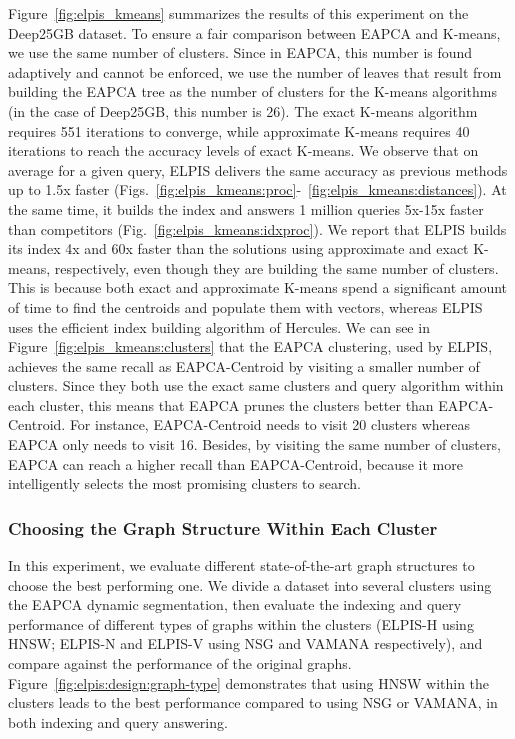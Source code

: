 Figure~\ref{fig:elpis_kmeans} summarizes the results of this experiment on the Deep25GB dataset. 
To ensure a fair comparison between EAPCA and K-means, we use the same number of clusters. Since in EAPCA, this number is found adaptively and cannot be enforced, we use the number of leaves that result from building the EAPCA tree as the number of clusters for the K-means algorithms (in the case of Deep25GB, this number is 26). 
The exact K-means algorithm requires 551 iterations to converge, while approximate K-means requires 40 iterations to reach the accuracy levels of exact K-means.
We observe that on average  for a given query, ELPIS delivers the same accuracy as previous methods up to 1.5x faster (Figs.~\ref{fig:elpis_kmeans:proc}-~\ref{fig:elpis_kmeans:distances}). 
At the same time, it builds the index and answers 1 million queries 5x-15x faster than competitors  (Fig.~\ref{fig:elpis_kmeans:idxproc}). 
We report that ELPIS builds its index 4x and 60x faster than the solutions using approximate and exact K-means, respectively, even though they are building the same number of clusters. This is because both exact and approximate K-means spend a significant amount of time to find the centroids and populate them with vectors, whereas ELPIS uses the efficient index building algorithm of Hercules.  
We can see in Figure~\ref{fig:elpis_kmeans:clusters} that the EAPCA clustering, used by ELPIS, achieves the same recall as EAPCA-Centroid by visiting a smaller number of clusters. 
Since they both use the exact same clusters and query algorithm within each cluster, this means that EAPCA prunes the clusters better than EAPCA-Centroid. 
For instance, EAPCA-Centroid needs to visit 20 clusters whereas EAPCA only needs to visit 16. 
Besides, by visiting the same number of clusters, EAPCA can reach a higher recall than EAPCA-Centroid, because it more intelligently selects the most promising clusters to search. 
\subsubsection{Choosing the Graph Structure Within Each Cluster}
In this experiment, we evaluate different state-of-the-art graph structures to choose the best performing one. We divide a dataset into several clusters using the EAPCA dynamic segmentation, then evaluate the indexing and query performance of different types of graphs within the clusters (ELPIS-H using HNSW; ELPIS-N and ELPIS-V using NSG and VAMANA respectively), and compare against the performance of the original graphs. Figure~\ref{fig:elpis:design:graph-type} demonstrates that using HNSW within the clusters leads to the best performance compared to using NSG or VAMANA, in both indexing and query answering.


